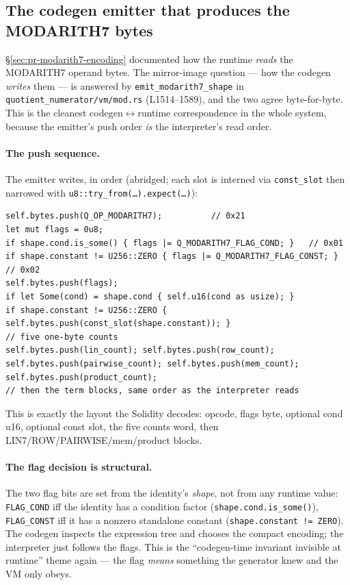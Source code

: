 \subsection{The codegen emitter that produces the MODARITH7 bytes}
\label{sec:pr-modarith7-emitter}

§\ref{sec:pr-modarith7-encoding} documented how the runtime
\emph{reads} the MODARITH7 operand bytes. The mirror-image
question --- how the codegen \emph{writes} them --- is answered by
\texttt{emit\_\allowbreak{}modarith7\_\allowbreak{}shape} in
\texttt{quotient\_\allowbreak{}numerator/\allowbreak{}vm/\allowbreak{}mod.rs} (L1514--1589), and the
two agree byte-for-byte. This is the cleanest codegen$\leftrightarrow$runtime
correspondence in the whole system, because the emitter's push
order \emph{is} the interpreter's read order.

\paragraph{The push sequence.}
The emitter writes, in order (abridged; each slot is interned via
\texttt{const\_slot} then narrowed with
\texttt{u8::try\_\allowbreak{}from(\ldots).expect(\ldots)}):
\begin{lstlisting}[style=rust]
self.bytes.push(Q_OP_MODARITH7);          // 0x21
let mut flags = 0u8;
if shape.cond.is_some() { flags |= Q_MODARITH7_FLAG_COND; }   // 0x01
if shape.constant != U256::ZERO { flags |= Q_MODARITH7_FLAG_CONST; } // 0x02
self.bytes.push(flags);
if let Some(cond) = shape.cond { self.u16(cond as usize); }
if shape.constant != U256::ZERO { self.bytes.push(const_slot(shape.constant)); }
// five one-byte counts
self.bytes.push(lin_count); self.bytes.push(row_count);
self.bytes.push(pairwise_count); self.bytes.push(mem_count);
self.bytes.push(product_count);
// then the term blocks, same order as the interpreter reads
\end{lstlisting}
This is exactly the layout the Solidity decodes: opcode, flags
byte, optional cond u16, optional const slot, the five counts
word, then LIN7/ROW/PAIRWISE/mem/product blocks.

\paragraph{The flag decision is structural.}
The two flag bits are set from the identity's \emph{shape}, not
from any runtime value: \texttt{FLAG\_COND} iff the identity has a
condition factor (\texttt{shape.cond.is\_\allowbreak{}some()}),
\texttt{FLAG\_CONST} iff it has a nonzero standalone constant
(\texttt{shape.constant != ZERO}). The codegen inspects the
expression tree and chooses the compact encoding; the interpreter
just follows the flags. This is the ``codegen-time invariant
invisible at runtime'' theme again --- the flag \emph{means}
something the generator knew and the VM only obeys.

